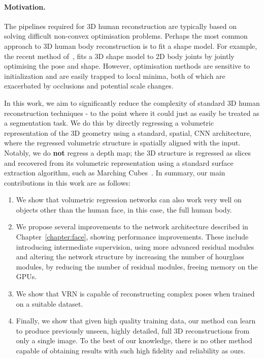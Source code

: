 \paragraph{Motivation.} The pipelines required for 3D human
reconstruction are typically based on solving difficult non-convex
optimisation problems. Perhaps the most common approach to 3D human
body reconstruction is to fit a shape model. For example, the recent
method of~\cite{bogo2016smplify}, fits a 3D shape model to 2D body
joints by jointly optimising the pose and shape. However, optimisation
methods are sensitive to initialization and are easily trapped to
local minima, both of which are exacerbated by occlusions and
potential scale changes.

In this work, we aim to significantly reduce the complexity of
standard 3D human reconstruction techniques - to the point where it
could just as easily be treated as a segmentation task. We do this by
directly regressing a volumetric representation of the 3D geometry
using a standard, spatial, CNN architecture, where the regressed
volumetric structure is spatially aligned with the input. Notably, we
do \textbf{not} regress a depth map; the 3D structure is regressed as
slices and recovered from its volumetric representation using a
standard surface extraction algorithm, such as Marching
Cubes~\cite{lorensen1987marching}. In summary, our main contributions
in this work are as follows:

\begin{enumerate}
\item We show that volumetric regression networks can also work very
  well on objects other than the human face, in this case, the full
  human body.

\item We propose several improvements to the network architecture
  described in Chapter~\ref{chapter:face}, showing performance
  improvements. These include introducing intermediate supervision,
  using more advanced residual modules and altering the network
  structure by increasing the number of hourglass modules, by reducing
  the number of residual modules, freeing memory on the GPUs.

\item We show that VRN is capable of reconstructing complex poses when
  trained on a suitable dataset.

\item Finally, we show that given high quality training data, our
  method can learn to produce previously unseen, highly detailed, full
  3D reconstructions from only a single image. To the best of our
  knowledge, there is no other method capable of obtaining results
  with such high fidelity and reliability as ours.
\end{enumerate}

